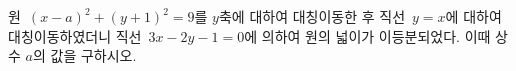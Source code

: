 원~$(x-a)^2+(y+1)^2=9$를 $y$축에 대하여 대칭이동한 후 직선~$y=x$에 대하여 대칭이동하였더니 직선~$3x-2y-1=0$에 의하여 원의 넓이가 이등분되었다. 이때 상수 $a$의 값을 구하시오.
